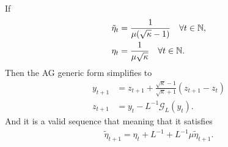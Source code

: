 \documentclass[12pt]{article}
\begin{document}
        \begin{theorem}
            \;\\
            If
            \begin{align*}
                \tilde \eta_t 
                &= \frac{1}{\mu(\sqrt{\kappa} - 1)}
                \quad \forall t \in \mathbb N, 
                \\
                \eta_t
                &= 
                \frac{1}{\mu\sqrt{\kappa}}
                \quad \forall t \in \mathbb N. 
            \end{align*}
            Then the AG generic form simplifies to 
            \begin{align*}
                y_{t + 1} &= z_{t + 1} + 
                \frac{\sqrt{\kappa} - 1}{\sqrt{\kappa} + 1}
                (z_{t +1} - z_t)
                \\
                z_{t + 1} 
                &= y_t - L^{-1}\mathcal G_L(y_t). 
            \end{align*}
            And it is a valid sequence that meaning that it satisfies 
            \begin{align*}
            \tilde \eta_{t + 1} = \eta_t + L^{-1} + L^{-1} \mu \tilde \eta_{t + 1}. 
            \end{align*}
        \end{theorem}
\end{document}
